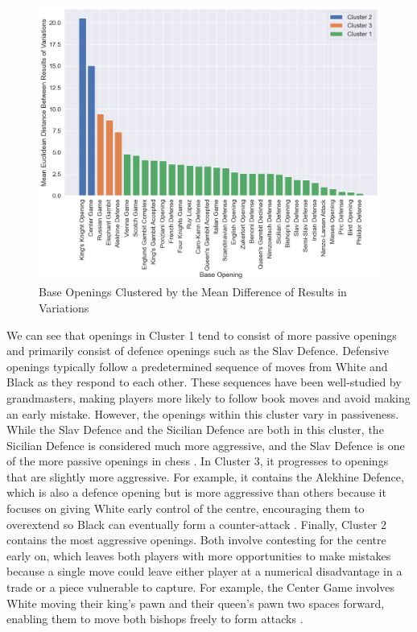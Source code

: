 \documentclass[a4paper, 11pt]{article}
\begin{document}
\begin{figure}[H]
    \centering
    \caption{Base Openings Clustered by the Mean Difference of Results in Variations}
    \label{fig:baseOpeningsClusteredByDifferenceOfResultsInVariations}
    \includegraphics[width=\textwidth]{Base Openings Clustered by Difference in Variations.png}
\end{figure}

We can see that openings in Cluster 1 tend to consist of more passive openings and primarily consist of defence openings such as the Slav Defence. Defensive openings typically follow a predetermined sequence of moves from White and Black as they respond to each other. These sequences have been well-studied by grandmasters, making players more likely to follow book moves and avoid making an early mistake. However, the openings within this cluster vary in passiveness. While the Slav Defence and the Sicilian Defence are both in this cluster, the Sicilian Defence is considered much more aggressive, and the Slav Defence is one of the more passive openings in chess \cite{slavDefenseAnalysis}. In Cluster 3, it progresses to openings that are slightly more aggressive. For example, it contains the Alekhine Defence, which is also a defence opening but is more aggressive than others because it focuses on giving White early control of the centre, encouraging them to overextend so Black can eventually form a counter-attack \cite{alekhinesDefenseAnalysis}. Finally, Cluster 2 contains the most aggressive openings. Both involve contesting for the centre early on, which leaves both players with more opportunities to make mistakes because a single move could leave either player at a numerical disadvantage in a trade or a piece vulnerable to capture. For example, the Center Game involves White moving their king's pawn and their queen's pawn two spaces forward, enabling them to move both bishops freely to form attacks \cite{centerGameAnalysis}.
\end{document}
